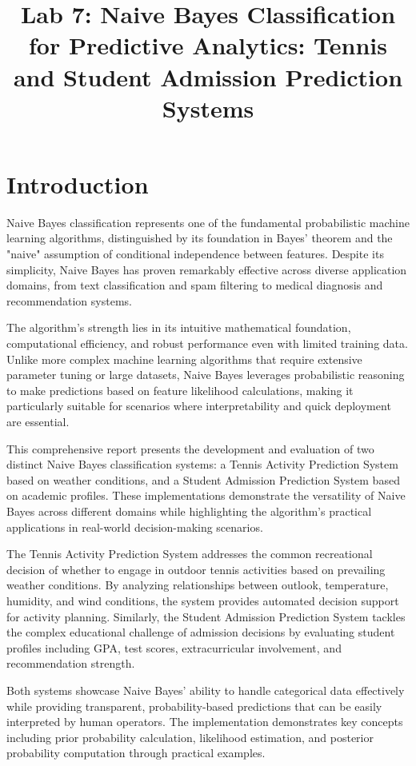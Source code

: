 \documentclass[11pt,a4paper]{article}
\title{Lab 7: Naive Bayes Classification for Predictive Analytics: Tennis and Student Admission Prediction Systems}
\date{}
\begin{document}
\maketitle

\section{Introduction}

Naive Bayes classification represents one of the fundamental probabilistic machine learning algorithms, distinguished by its foundation in Bayes' theorem and the "naive" assumption of conditional independence between features. Despite its simplicity, Naive Bayes has proven remarkably effective across diverse application domains, from text classification and spam filtering to medical diagnosis and recommendation systems.

The algorithm's strength lies in its intuitive mathematical foundation, computational efficiency, and robust performance even with limited training data. Unlike more complex machine learning algorithms that require extensive parameter tuning or large datasets, Naive Bayes leverages probabilistic reasoning to make predictions based on feature likelihood calculations, making it particularly suitable for scenarios where interpretability and quick deployment are essential.

This comprehensive report presents the development and evaluation of two distinct Naive Bayes classification systems: a Tennis Activity Prediction System based on weather conditions, and a Student Admission Prediction System based on academic profiles. These implementations demonstrate the versatility of Naive Bayes across different domains while highlighting the algorithm's practical applications in real-world decision-making scenarios.

The Tennis Activity Prediction System addresses the common recreational decision of whether to engage in outdoor tennis activities based on prevailing weather conditions. By analyzing relationships between outlook, temperature, humidity, and wind conditions, the system provides automated decision support for activity planning. Similarly, the Student Admission Prediction System tackles the complex educational challenge of admission decisions by evaluating student profiles including GPA, test scores, extracurricular involvement, and recommendation strength.

Both systems showcase Naive Bayes' ability to handle categorical data effectively while providing transparent, probability-based predictions that can be easily interpreted by human operators. The implementation demonstrates key concepts including prior probability calculation, likelihood estimation, and posterior probability computation through practical examples.
\end{document}
